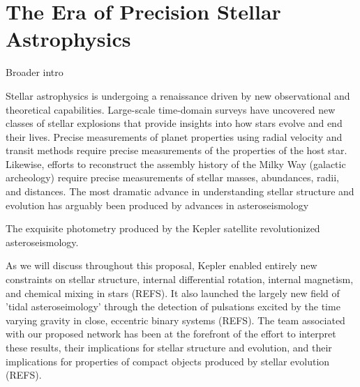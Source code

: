 \section{The Era of Precision Stellar Astrophysics}
Broader intro

Stellar astrophysics is undergoing a renaissance driven by new observational and theoretical capabilities. Large-scale time-domain surveys have uncovered new classes of stellar explosions that provide insights into how stars evolve and end their lives.  Precise measurements of planet properties using radial velocity and transit methods require precise measurements of the properties of the host star.  Likewise, efforts to reconstruct the assembly history of the Milky Way (galactic archeology) require precise measurements of stellar masses, abundances, radii, and distances.    The most dramatic advance in understanding stellar structure and evolution has arguably been produced by advances in asteroseismology

The exquisite photometry produced by the Kepler satellite revolutionized asteroseismology.  

As we will discuss throughout this proposal, Kepler enabled entirely new constraints on stellar structure, internal differential rotation, internal magnetism, and chemical mixing in stars (REFS).  It also launched the largely new field of 'tidal asteroseimology' through the detection of pulsations excited by the time varying gravity in close, eccentric binary systems (REFS). The team associated with our proposed network has been at the forefront of the effort to interpret these results, their implications for stellar structure and evolution, and their implications for properties of compact objects produced by stellar evolution (REFS).   

